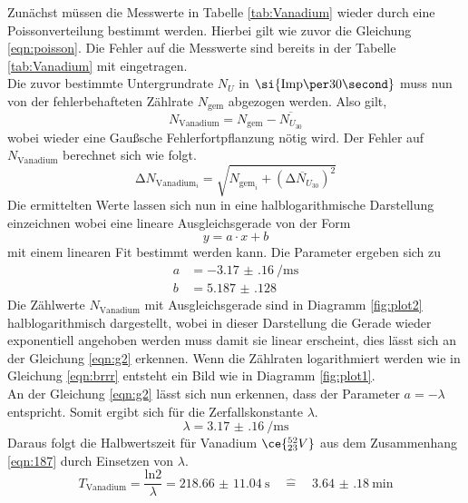 Zunächst müssen die Messwerte in Tabelle \ref{tab:Vanadium} wieder durch eine Poissonverteilung bestimmt werden.
Hierbei gilt wie zuvor die Gleichung \ref{eqn:poisson}. Die Fehler auf die Messwerte sind bereits in der 
Tabelle \ref{tab:Vanadium} mit eingetragen.
\\
\newline
Die zuvor bestimmte Untergrundrate $N_{U}$ in $\si{{\text{Imp\per}{30}}\second}$ muss nun von der fehlerbehafteten Zählrate
$N_{\text{gem}}$ abgezogen werden. Also gilt,
\begin{equation}
N_{\text{Vanadium}} = N_{\text{gem}} - \overline{N_{U_{30}}}
\end{equation}
wobei wieder eine Gaußsche Fehlerfortpflanzung nötig wird. Der Fehler auf $N_{\text{Vanadium}}$ berechnet sich wie folgt.
\begin{equation}
\increment N_{{\text{Vanadium}_{i}}} = \sqrt{N_{{\text{gem}_{i}}} + (\overline{\increment N_{U_{30}}})^{2} }
\end{equation}
Die ermittelten Werte lassen sich nun in eine halblogarithmische Darstellung einzeichnen wobei eine lineare Ausgleichsgerade
von der Form
\begin{equation}
y = a \cdot x + b
\end{equation}
mit einem linearen Fit bestimmt werden kann. Die Parameter ergeben sich zu
\begin{align}
a &= \SI{-3.17(16)}{\per\milli\second} \\
b &= \SI{5.187(128)}{}
\end{align}
Die Zählwerte $N_{\text{Vanadium}}$ mit Ausgleichsgerade sind in Diagramm \ref{fig:plot2} halblogarithmisch dargestellt, wobei in dieser Darstellung die Gerade wieder exponentiell angehoben werden muss damit sie linear erscheint, dies lässt sich
an der Gleichung \eqref{eqn:g2} erkennen.
Wenn die Zählraten logarithmiert werden wie in Gleichung \eqref{eqn:brrr} entsteht ein Bild wie in Diagramm \ref{fig:plot1}.
\\
\newline
An der Gleichung \eqref{eqn:g2} lässt sich nun erkennen, dass der Parameter $a = -\lambda$ entspricht. Somit ergibt sich für die 
Zerfallskonstante $\lambda$.
\begin{equation}
\lambda = \SI{3.17(16)}{\per\milli\second} 
\end{equation}
Daraus folgt die Halbwertszeit für Vanadium $\ce{^{52}_{23}V}$ aus dem Zusammenhang \eqref{eqn:187} durch Einsetzen von $\lambda$.
\begin{equation}
T_{\text{Vanadium}} = \frac{\text{ln}2}{\lambda} = \SI{218.66(1104)}{\second} \quad  \widehat{=} \quad \SI{3.64(18)}{\minute}
\end{equation}
